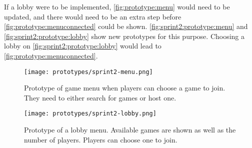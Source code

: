 If a lobby were to be implemented, \autoref{fig:prototype:menu} would need to be updated, and there would need to be an extra step before \autoref{fig:prototype:menuconnected} could be shown.
\autoref{fig:sprint2:prototype:menu} and \autoref{fig:sprint2:prototype:lobby} show new prototypes for this purpose.
Choosing a lobby on \autoref{fig:sprint2:prototype:lobby} would lead to \autoref{fig:prototype:menuconnected}.
\begin{figure}[H]
    \centering
    \texttt{[image: prototypes/sprint2-menu.png]}
    \caption{Prototype of game menu when players can choose a game to join. They need to either search for games or host one.}
    \label{fig:sprint2:prototype:menu}
\end{figure}

\begin{figure}[H]
    \centering
    \texttt{[image: prototypes/sprint2-lobby.png]}
    \caption{Prototype of a lobby menu. Available games are shown as well as the number of players. Players can choose one to join.}
    \label{fig:sprint2:prototype:lobby}
\end{figure}
